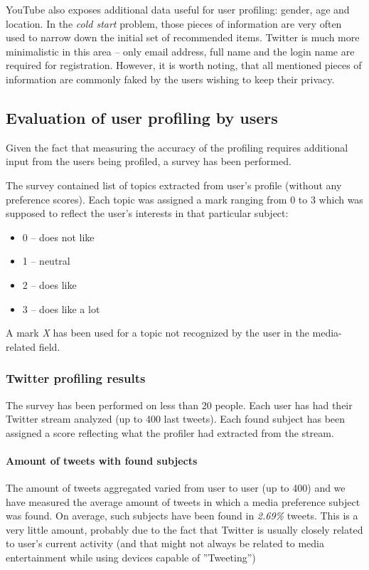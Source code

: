 YouTube also exposes additional data useful for user profiling: gender, age and
location. In the \textit{cold start} problem, those pieces of information are very
often used to narrow down the initial set of recommended items. Twitter is much
more minimalistic in this area -- only email address, full name and the login
name are required for registration. However, it is worth noting, that all
mentioned pieces of information are commonly faked by the users wishing to keep
their privacy.

\subsection{Evaluation of user profiling by users}
Given the fact that measuring the accuracy of the profiling requires additional input
from the users being profiled, a survey has been performed.

The survey contained list of topics extracted from user's profile (without any preference scores).
Each topic was assigned a mark ranging from 0 to 3 which was supposed to reflect the user's interests
in that particular subject:
\begin{itemize}
\item 0 -- does not like
\item 1 -- neutral
\item 2 -- does like
\item 3 -- does like a lot
\end{itemize}
A mark \textit{X} has been used for a topic not recognized by the user in the media-related field.

\subsubsection{Twitter profiling results}

The survey has been performed on less than 20 people. Each user has had their Twitter stream analyzed
(up to 400 last tweets). Each found subject has been assigned a score reflecting what the profiler
had extracted from the stream.

\paragraph{Amount of tweets with found subjects}
The amount of tweets aggregated varied from user to user (up to 400) and we have measured the average amount
of tweets in which a media preference subject was found. On average, such subjects have been found in \textit{2.69\%}
tweets. This is a very little amount, probably due to the fact that Twitter is usually closely related to user's current
activity (and that might not always be related to media entertainment while using devices capable of ''Tweeting'')

